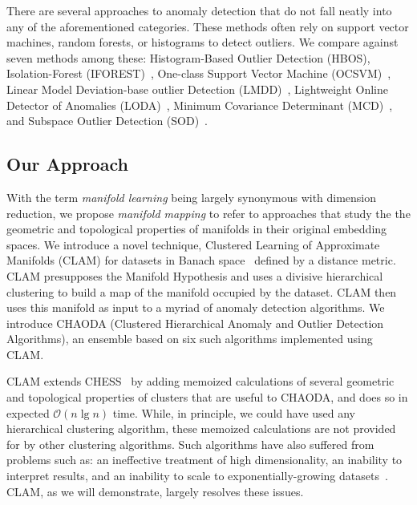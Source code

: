 There are several approaches to anomaly detection that do not fall neatly into any of the aforementioned categories.
These methods often rely on support vector machines, random forests, or histograms to detect outliers.
We compare against seven methods among these:
Histogram-Based Outlier Detection (HBOS)\cite{goldstein2012histogram},
Isolation-Forest (IFOREST)~\cite{tony2008iforest,tony2012iforest},
One-class Support Vector Machine (OCSVM)~\cite{sholkopf2001ocsvm},
Linear Model Deviation-base outlier Detection (LMDD)~\cite{arning1996linear},
Lightweight Online Detector of Anomalies (LODA)~\cite{pevny2016loda},
Minimum Covariance Determinant (MCD)~\cite{rousseeuw1999mcd,hardin2004mcd}, and
Subspace Outlier Detection (SOD)~\cite{kriegel2009sod}.


\subsection{Our Approach}
\label{subsec:introduction:chaoda}

With the term \emph{manifold learning} being largely synonymous with dimension reduction, we propose \emph{manifold mapping} to refer to approaches that study the the geometric and topological properties of manifolds in their original embedding spaces.
We introduce a novel technique, Clustered Learning of Approximate Manifolds (CLAM) for datasets in Banach space~\cite{banach1929fonctionnelles} defined by a distance metric.
CLAM presupposes the Manifold Hypothesis and uses a divisive hierarchical clustering to build a map of the manifold occupied by the dataset.
CLAM then uses this manifold as input to a myriad of anomaly detection algorithms.
We introduce CHAODA (Clustered Hierarchical Anomaly and Outlier Detection Algorithms), an ensemble based on six such algorithms implemented using CLAM.

CLAM extends CHESS~\cite{ishaq2019clustered} by adding memoized calculations of several geometric and topological properties of clusters that are useful to CHAODA, and does so in expected $\mathcal{O}(n \lg n)$ time.
While, in principle, we could have used any hierarchical clustering algorithm, these memoized calculations are not provided for by other clustering algorithms.
Such algorithms have also suffered from problems such as:
an ineffective treatment of high dimensionality,
an inability to interpret results, and
an inability to scale to exponentially-growing datasets~\cite{agrawal1998automatic}.
CLAM, as we will demonstrate, largely resolves these issues.


